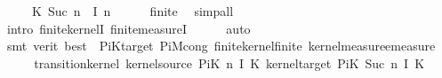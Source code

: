 \begin{isabellebody}
\ \ \ \ {\isacharparenleft}{\kern0pt}{\isasymlambda}{\isasymomega}{\isachardot}{\kern0pt}\ {\isacharquery}{\kern0pt}K\ {\isacharparenleft}{\kern0pt}Suc\ n{\isacharparenright}{\kern0pt}\ {\isacharparenleft}{\kern0pt}{\isasymomega}\ {\isacharparenleft}{\kern0pt}I\ n{\isacharparenright}{\kern0pt}{\isacharparenright}{\kern0pt}{\isacharparenright}{\kern0pt}{\isachardoublequoteclose}{\isacharbrackright}{\kern0pt}{\isacharparenright}{\kern0pt}\isanewline
\ \ \ \ \isamarkupfalse%
\ finite\ \isamarkupfalse%
\ simp{\isacharunderscore}{\kern0pt}all\isanewline
\ \ \ \ \isamarkupfalse%
\ {\isacharparenleft}{\kern0pt}intro\ finite{\isacharunderscore}{\kern0pt}kernelI\ finite{\isacharunderscore}{\kern0pt}measureI{\isacharparenright}{\kern0pt}\isanewline
\ \ \ \ \isamarkupfalse%
\ auto\isanewline
\ \ \ \ \isamarkupfalse%
\ {\isacharparenleft}{\kern0pt}smt\ {\isacharparenleft}{\kern0pt}verit{\isacharcomma}{\kern0pt}\ best{\isacharparenright}{\kern0pt}\ {\isachardoublequoteopen}{}{\isachardoublequoteclose}\ PiK{\isacharunderscore}{\kern0pt}target\ PiM{\isacharunderscore}{\kern0pt}cong\ finite{\isacharunderscore}{\kern0pt}kernel{\isacharunderscore}{\kern0pt}finite\ kernel{\isacharunderscore}{\kern0pt}measure{\isacharunderscore}{\kern0pt}emeasure{\isacharparenright}{\kern0pt}\isanewline
\ \ \isamarkupfalse%
\ \isamarkupfalse%
\ {\isachardoublequoteopen}transition{\isacharunderscore}{\kern0pt}kernel\ {\isacharparenleft}{\kern0pt}kernel{\isacharunderscore}{\kern0pt}source\ {\isacharparenleft}{\kern0pt}PiK\ n\ I\ K{\isacharparenright}{\kern0pt}{\isacharparenright}{\kern0pt}\ {\isacharparenleft}{\kern0pt}kernel{\isacharunderscore}{\kern0pt}target\ {\isacharparenleft}{\kern0pt}PiK\ {\isacharparenleft}{\kern0pt}Suc\ n{\isacharparenright}{\kern0pt}\ I\ K{\isacharparenright}{\kern0pt}{\isacharparenright}{\kern0pt}\isanewline

\end{isabellebody}
